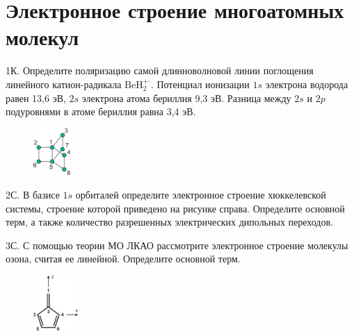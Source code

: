\setmainfont{Noto Serif}
\setsansfont{Noto Sans}
\setmonofont{Noto Sans Mono}


\section{Электронное строение многоатомных молекул}
1К. Определите поляризацию самой длинноволновой линии поглощения линейного катион-радикала $\text{BeH}_2^{+\boldsymbol{\cdot}}$. Потенциал ионизации $1s$ электрона водорода равен 13,6 эВ, $2s$ электрона атома бериллия 9,3 эВ. Разница между $2s$ и $2p$ подуровнями в атоме бериллия равна 3,4 эВ.
\par
\begin{figure} %
    \centering
    \vspace{-5.6ex}
     \includegraphics[width=14mm]{images/Fig_1_7_1.png}
    \vspace{-6mm}
\end{figure}
2С. В базисе $1s$ орбиталей определите электронное строение хюккелевской системы, строение которой приведено на рисунке справа. Определите основной терм, а также количество разрешенных электрических дипольных переходов.
\par
3С. С помощью теории МО ЛКАО рассмотрите электронное строение молекулы озона, считая ее линейной. Определите основной терм.
\par
\begin{figure} %
    \centering
    \vspace{-8.5mm}
    \includegraphics[width=17mm]{images/Fig_1_7_2.png}
    \vspace{-5mm}
\end{figure}
